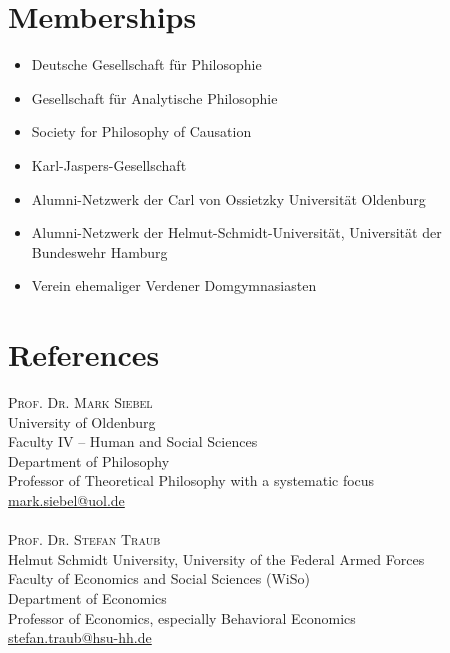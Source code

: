 \documentclass[a4paper,10pt]{article}
\begin{document}
\section{Memberships}
\begin{itemize}
   \item Deutsche Gesellschaft für Philosophie
   \item Gesellschaft für Analytische Philosophie
   \item Society for Philosophy of Causation
   \item Karl-Jaspers-Gesellschaft
   \item Alumni-Netzwerk der Carl von Ossietzky Universität Oldenburg
   \item Alumni-Netzwerk der Helmut-Schmidt-Universität, Universität der Bundeswehr Hamburg
   \item Verein ehemaliger Verdener Domgymnasiasten
\end{itemize}


\clearpage
\section{References}
\textsc{Prof\hspace{0.5pt}. Dr\hspace{0.5pt}. Mark Siebel}\\
University of Oldenburg\\
Faculty IV -- Human and Social Sciences\\
Department of Philosophy\\
Professor of Theoretical Philosophy with a systematic focus\\
\href{mailto:mark.siebel@uol.de}{mark.siebel@uol.de}\\
\\
\textsc{Prof\hspace{0.5pt}. Dr\hspace{0.5pt}. Stefan Traub}\\
Helmut Schmidt University, University of the Federal Armed Forces\\
Faculty of Economics and Social Sciences (WiSo)\\
Department of Economics\\
Professor of Economics, especially Behavioral Economics\\
\href{mailto:stefan.traub@hsu-hh.de}{stefan.traub@hsu-hh.de}\\
\end{document}
